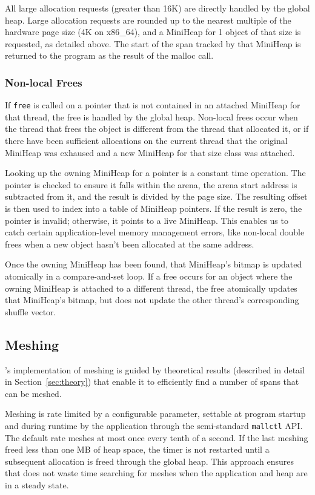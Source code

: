 All large allocation requests (greater than 16K) are directly
handled by the global heap. Large allocation requests are rounded up
to the nearest multiple of the hardware page size (4K on x86\_64),
and a MiniHeap for 1 object of that size is requested, as detailed
above.  The start of the span tracked by that MiniHeap is returned to
the program as the result of the malloc call.

\subsubsection{Non-local Frees}

If \texttt{free} is called on a pointer that is not contained in an
attached MiniHeap for that thread, the free is handled by the global
heap.  Non-local frees occur when the thread that frees the object is
different from the thread that allocated it, or if there have been
sufficient allocations on the current thread that the original
MiniHeap was exhaused and a new MiniHeap for that size class was
attached.

Looking up the owning MiniHeap for a pointer is a constant time
operation. The pointer is checked to ensure it falls within the arena,
the arena start address is subtracted from it, and the result is
divided by the page size.  The resulting offset is then used to index
into a table of MiniHeap pointers. If the result is zero, the pointer
is invalid; otherwise, it points to a live MiniHeap.  This enables us
to catch certain application-level memory management errors, like
non-local double frees when a new object hasn't been allocated at the
same address.

Once the owning MiniHeap has been found, that MiniHeap's bitmap is
updated atomically in a compare-and-set loop.  If a free occurs for an
object where the owning MiniHeap is attached to a different thread,
the free atomically updates that MiniHeap's bitmap, but does not
update the other thread's corresponding shuffle vector.


\subsection{Meshing}
\label{sec:meshing-implementation}

\Mesh's implementation of meshing is guided by theoretical results
(described in detail in Section~\ref{sec:theory}) that enable it to
efficiently find a number of spans that can be meshed.

Meshing is rate limited by a configurable parameter, settable at
program startup and during runtime by the application through the
semi-standard \texttt{mallctl} API.  The default rate meshes at most
once every tenth of a second.  If the last meshing freed less than one
MB of heap space, the timer is not restarted until a subsequent
allocation is freed through the global heap.  This approach ensures that \Mesh
does not waste time searching for meshes when the application and heap
are in a steady state.

